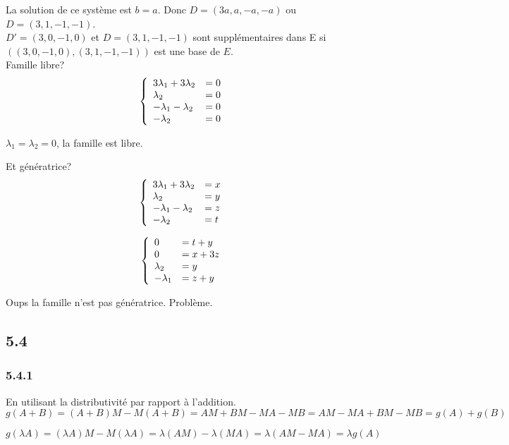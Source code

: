 \documentclass[]{book}
\theoremstyle{definition}
\begin{document}
La solution de ce syst\`eme est $b=a$. Donc $D=(3a,a,-a,-a)$ ou $D=(3,1,-1,-1)$.\\

$D'=(3,0,-1,0)$ et $D=(3,1,-1,-1)$ sont suppl\'ementaires dans E si $((3,0,-1,0),(3,1,-1,-1)) $ est une base de $E$. \\

Famille libre?
$$
\left\{ 
\begin{array}{l l}
3\lambda_1 + 3\lambda_2& = 0 \\
\lambda_2 & = 0 \\
-\lambda_1 -\lambda_2 & = 0 \\
-\lambda_2 & = 0 \\
\end{array}
\right. 
$$

$\lambda_1=\lambda_2=0$, la famille est libre. 

Et g\'en\'eratrice?
$$
\left\{ 
\begin{array}{l l}
3\lambda_1 + 3\lambda_2& = x \\
\lambda_2 & = y \\
-\lambda_1 -\lambda_2 & = z \\
-\lambda_2 & = t \\
\end{array}
\right. 
$$

$$
\left\{ 
\begin{array}{l l}
0 & = t + y\\
0 & = x +3z\\
\lambda_2 & = y \\
-\lambda_1 & = z + y \\
\end{array}
\right. 
$$

Oups la famille n'est pas g\'en\'eratrice. Probl\`eme.\\


\subsection*{5.4}	
\subsubsection*{5.4.1}	
En utilisant la distributivit\'e par rapport \`a l'addition.
$$g(A+B) = (A+B)M - M(A+B) = AM+BM -MA -MB = AM -MA +BM -MB = g(A) + g(B)$$

$$g(\lambda A) = (\lambda A)M - M(\lambda A) = \lambda (AM) - \lambda(MA) = \lambda (AM-MA) = \lambda g(A)$$
\end{document}
